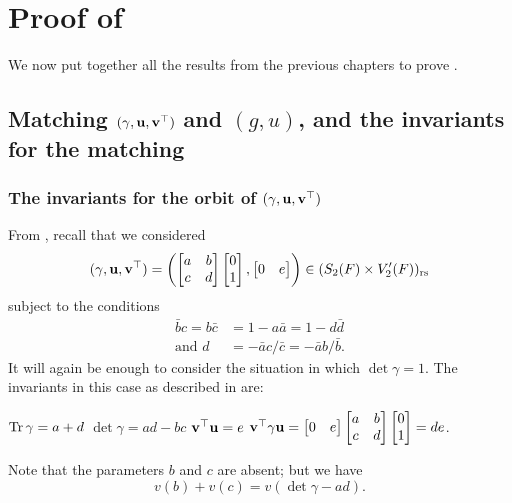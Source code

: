\chapter{Proof of }
\label{ch:finale}
We now put together all the results from the previous chapters to
prove .

\section{Matching ${(\gamma, \mathbf u, \mathbf v^\top)}$ and $(g,u)$, and the invariants for the matching}
\subsection{The invariants for the orbit of ${(\gamma, \mathbf u, \mathbf v^\top)}$}
From , recall that we considered
\[
  (\gamma, \mathbf u, \mathbf v^\top)
  =
  \left( \begin{bmatrix} a & b \\ c & d \end{bmatrix}
    \begin{bmatrix} 0 \\ 1 \end{bmatrix}, \begin{bmatrix} 0 & e \end{bmatrix} \right)
  \in (S_2(F) \times V'_2(F))_{\mathrm{rs}}
\]
subject to the conditions
\begin{align*}
  \bar b c = b \bar c &= 1 - a \bar a = 1 - d \bar d \\
  \text{and } d &= - \bar a c / \bar c = -\bar a b / \bar b.
\end{align*}
It will again be enough to consider the situation in which $\det \gamma = 1$.
The invariants in this case as described in  are:
\begin{itemize}
  \ii $\operatorname{Tr} \gamma = a + d$
  \ii $\det \gamma = ad - bc$
  \ii $\mathbf v^\top \mathbf u = e$
  \ii $\mathbf v^\top \gamma \mathbf u = \begin{bmatrix} 0 & e \end{bmatrix}
  \begin{bmatrix} a & b \\ c & d \end{bmatrix} \begin{bmatrix} 0 \\ 1 \end{bmatrix} = de$.
\end{itemize}
Note that the parameters $b$ and $c$ are absent; but we have
\[ v(b) + v(c) = v(\det \gamma - a d). \]


